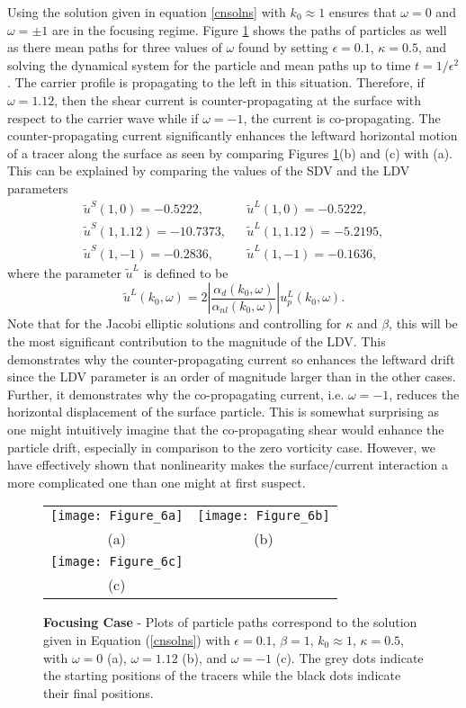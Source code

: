 \documentclass{JFM_Style/jfm}
\begin{document}
Using the solution given in equation \eqref{cnsolns} with $k_0\approx1$ ensures that $\omega = 0$ and $\omega=\pm 1$ are in the focusing regime.   Figure \ref{fig:foc_kap_pt5} shows the paths of particles as well as there mean paths for three values of $\omega$ found by setting $\epsilon=0.1$, $\kappa=0.5$, and solving the dynamical system for the particle and mean paths up to time $t=1/\epsilon^{2}$.  The carrier profile is propagating to the left in this situation.  Therefore, if $\omega=1.12$, then the shear current is counter-propagating at the surface with respect to the carrier wave while if $\omega=-1$, the current is co-propagating.  The counter-propagating current significantly enhances the leftward horizontal motion of a tracer along the surface as seen by comparing Figures \ref{fig:foc_kap_pt5}(b) and (c) with (a).  This can be explained by comparing the values of the SDV and the LDV parameters
\[
\begin{array}{lcl}
\tilde{u}^{S}(1,0) = -0.5222, & & \tilde{u}^{L}(1,0) = -0.5222,\\
\tilde{u}^{S}(1,1.12) = -10.7373,& & \tilde{u}^{L}(1,1.12) = -5.2195,\\
\tilde{u}^{S}(1,-1) = -0.2836, & & \tilde{u}^{L}(1,-1) = -0.1636,
\end{array}
\]
where the parameter $\tilde{u}^{L}$ is defined to be
\[
\tilde{u}^{L}(k_{0},\omega) = 2\left|\frac{\alpha_{d}(k_{0},\omega)}{\alpha_{nl}(k_{0},\omega)}\right|u^{L}_{p}(k_{0},\omega).
\]
Note that for the Jacobi elliptic solutions and controlling for $\kappa$ and $\beta$, this will be the most significant contribution to the magnitude of the LDV.  This demonstrates why the counter-propagating current so enhances the leftward drift since the LDV parameter is an order of magnitude larger than in the other cases.    Further, it demonstrates why the co-propagating current, i.e. $\omega=-1$, reduces the horizontal displacement of the surface particle.  This is somewhat surprising as one might intuitively imagine that the co-propagating shear would enhance the particle drift, especially in comparison to the zero vorticity case.  However, we have effectively shown that nonlinearity makes the surface/current interaction a more complicated one than one might at first suspect.
\begin{figure}
\centering
\begin{tabular}{cc}
\texttt{[image: Figure\_6a]} & \texttt{[image: Figure\_6b]} \\
(a) & (b) \\
\texttt{[image: Figure\_6c]} & \\
(c) &
\end{tabular}
\caption{\small {\bf Focusing Case} - Plots of particle paths correspond to the solution given in Equation (\ref{cnsolns}) with $\epsilon=0.1$, $\beta=1$, $k_{0}\approx 1$, $\kappa=0.5$, with $\omega=0$ (a), $\omega=1.12$ (b), and $\omega=-1$ (c). The grey dots indicate the starting positions of the tracers while the black dots indicate their final positions.}
\label{fig:foc_kap_pt5}
\end{figure}
\end{document}
